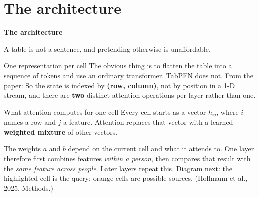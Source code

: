 \documentclass[aspectratio=169]{beamer}
\begin{document}
\section{The architecture}

\begin{frame}[plain]
  \vfill
  \begin{center}
    {\Large\color{popblue}\textbf{The architecture}}\\[0.9em]
    \begin{minipage}{0.82\textwidth}\centering\small
      A table is not a sentence, and pretending otherwise is unaffordable.
    \end{minipage}
  \end{center}
  \vfill
\end{frame}

\begin{frame}{One representation per cell}
  \small
  The obvious thing is to flatten the table into a sequence of tokens and use an ordinary
  transformer. TabPFN does not. From the paper:
  \vskip 6pt
  \vskip 8pt
  So the state is indexed by \textbf{(row, column)}, not by position in a 1-D stream, and there
  are \textbf{two} distinct attention operations per layer rather than one.
\end{frame}

\begin{frame}{What attention computes for one cell}
  \small
  Every cell starts as a vector $h_{ij}$, where $i$ names a row and $j$ a feature.
  Attention replaces that vector with a learned \textbf{weighted mixture} of other vectors.
  \vskip 7pt
  \begin{center}
  \end{center}
  \vskip 7pt
  The weights $a$ and $b$ depend on the current cell and what it attends to.
  One layer therefore first combines features \emph{within a person}, then compares
  that result with the \emph{same feature across people}. Later layers repeat this.
  \vskip 5pt
  \footnotesize
  Diagram next: the highlighted cell is the query; orange cells are possible sources.
  (Hollmann et al., 2025, Methods.)
\end{frame}
\end{document}

